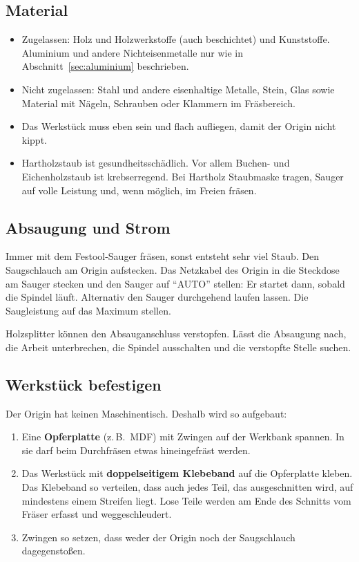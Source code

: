 \documentclass{\basedir/fablab-document}
\begin{document}
	\subsection{Material}
	\begin{itemize}
		\item Zugelassen: Holz und Holzwerkstoffe (auch beschichtet) und Kunststoffe. Aluminium und andere Nichteisenmetalle nur wie in Abschnitt~\ref{sec:aluminium} beschrieben.
		\item Nicht zugelassen: Stahl und andere eisenhaltige Metalle, Stein, Glas sowie Material mit Nägeln, Schrauben oder Klammern im Fräsbereich.
		\item Das Werkstück muss eben sein und flach aufliegen, damit der Origin nicht kippt.
		\item Hartholzstaub ist gesundheitsschädlich. Vor allem Buchen- und Eichenholzstaub ist krebserregend. Bei Hartholz Staubmaske tragen, Sauger auf volle Leistung und, wenn möglich, im Freien fräsen.
	\end{itemize}

	\subsection{Absaugung und Strom}
	\label{sec:absaugung}
	Immer mit dem Festool-Sauger fräsen, sonst entsteht sehr viel Staub. Den Saugschlauch am Origin aufstecken. Das Netzkabel des Origin in die Steckdose am Sauger stecken und den Sauger auf \enquote{AUTO} stellen: Er startet dann, sobald die Spindel läuft. Alternativ den Sauger durchgehend laufen lassen. Die Saugleistung auf das Maximum stellen.

	Holzsplitter können den Absauganschluss verstopfen. Lässt die Absaugung nach, die Arbeit unterbrechen, die Spindel ausschalten und die verstopfte Stelle suchen.

	\subsection{Werkstück befestigen}
	\label{sec:spannen}
	Der Origin hat keinen Maschinentisch. Deshalb wird so aufgebaut:
	\begin{enumerate}
		\item Eine \textbf{Opferplatte} (z.\,B.\ MDF) mit Zwingen auf der Werkbank spannen. In sie darf beim Durchfräsen etwas hineingefräst werden.
		\item Das Werkstück mit \textbf{doppelseitigem Klebeband} auf die Opferplatte kleben. Das Klebeband so verteilen, dass auch jedes Teil, das ausgeschnitten wird, auf mindestens einem Streifen liegt. Lose Teile werden am Ende des Schnitts vom Fräser erfasst und weggeschleudert.
		\item Zwingen so setzen, dass weder der Origin noch der Saugschlauch dagegenstoßen.
	\end{enumerate}
\end{document}
